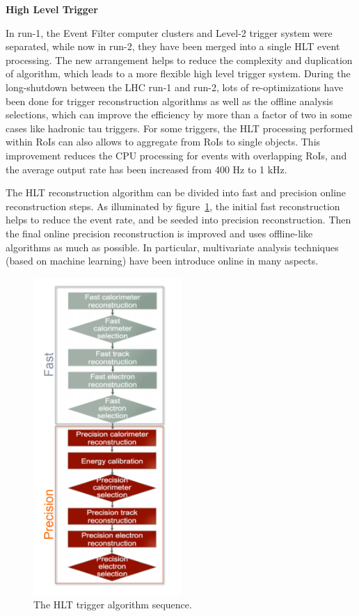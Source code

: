 \textbf{High Level Trigger}

In run-1, the Event Filter computer clusters and Level-2 trigger system were separated,
while now in run-2, they have been merged into a single HLT event processing.
The new arrangement helps to reduce the complexity and duplication of algorithm, which leads to a more flexible high level trigger system.
During the long-shutdown between the LHC run-1 and run-2, lots of re-optimizations have been done for trigger reconstruction algorithms as well as the offline analysis selections,
which can improve the efficiency by more than a factor of two in some cases like hadronic tau triggers.
For some triggers, the HLT processing performed within RoIs can also allows to aggregate from RoIs to single objects. 
This improvement reduces the CPU processing for events with overlapping RoIs, and the average output rate has been increased from 400 Hz to 1 kHz.

The HLT reconstruction algorithm can be divided into fast and precision online reconstruction steps. 
As illuminated by figure~\ref{fig:trig_alg}, the initial fast reconstruction helps to reduce the event rate, and be seeded into precision reconstruction.
Then the final online precision reconstruction is improved and uses offline-like algorithms as much as possible.
In particular, multivariate analysis techniques (based on machine learning) have been introduce online in many aspects.
\begin{figure}[!htb]
  \centering
  \includegraphics[width=0.5\textwidth]{figures/Detector/trig_alg.png}
  \caption{ The HLT trigger algorithm sequence\cite{Pasztor:2063746}.}
  \label{fig:trig_alg}
\end{figure}

